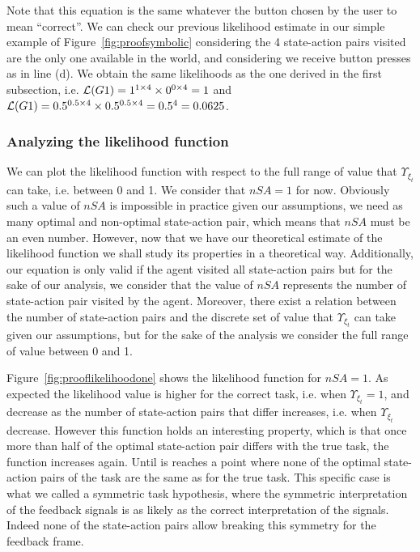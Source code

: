 

Note that this equation is the same whatever the button chosen by the user to mean ``correct''. We can check our previous likelihood estimate in our simple example of Figure~\ref{fig:proofsymbolic} considering the 4 state-action pairs visited are the only one available in the world, and considering we receive button presses as in line (d). We obtain the same likelihoods as the one derived in the first subsection, i.e. $\mathcal{L}(G1) = 1^{1\times4} \times 0^{0\times4} = 1$ and $\mathcal{L}(G1) = 0.5^{0.5\times4} \times 0.5^{0.5\times4} = 0.5^4 = 0.0625$.

\subsubsection*{Analyzing the likelihood function}

We can plot the likelihood function with respect to the full range of value that $\Upsilon_{\xi_t}$ can take, i.e. between 0 and 1. We consider that $nSA = 1$ for now. Obviously such a value of $nSA$ is impossible in practice given our assumptions, we need as many optimal and non-optimal state-action pair, which means that $nSA$ must be an even number. However, now that we have our theoretical estimate of the likelihood function we shall study its properties in a theoretical way. Additionally, our equation is only valid if the agent visited all state-action pairs but for the sake of our analysis, we consider that the value of $nSA$ represents the number of state-action pair visited by the agent. Moreover, there exist a relation between the number of state-action pairs and the discrete set of value that $\Upsilon_{\xi_t}$ can take given our assumptions, but for the sake of the analysis we consider the full range of value between 0 and 1.

Figure~\ref{fig:prooflikelihoodone} shows the likelihood function for $nSA = 1$. As expected the likelihood value is higher for the correct task, i.e. when $\Upsilon_{\xi_t} = 1$, and decrease as the number of state-action pairs that differ increases, i.e. when $\Upsilon_{\xi_t}$ decrease. However this function holds an interesting property, which is that once more than half of the optimal state-action pair differs with the true task, the function increases again. Until is reaches a point where none of the optimal state-action pairs of the task are the same as for the true task. This specific case is what we called a symmetric task hypothesis, where the symmetric interpretation of the feedback signals is as likely as the correct interpretation of the signals. Indeed none of the state-action pairs allow breaking this symmetry for the feedback frame. 

